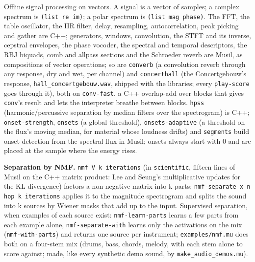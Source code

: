 \documentclass[11pt,a4paper]{article}
\newcommand{\musil}[1]{\lstinline[style=musilinline]{#1}}
\begin{document}
Offline signal processing on vectors. A signal is a vector of samples; a complex
spectrum is \musil{(list re im)}; a polar spectrum is \musil{(list mag phase)}. The FFT,
the table oscillator, the IIR filter, delay, resampling, autocorrelation, peak
picking and gather are C++; generators, windows, convolution, the STFT and its
inverse, cepstral envelopes, the phase vocoder, the spectral and temporal descriptors,
the RBJ biquads, comb and allpass sections and the Schroeder reverb are Musil, as
compositions of vector operations; so are \musil{converb} (a convolution reverb through
any response, dry and wet, per channel) and \musil{concerthall} (the Concertgebouw's
response, \texttt{hall\_concertgebouw.wav}, shipped with the libraries; every
\musil{play-score} goes through it), both on \musil{conv-fast}, a C++ overlap-add over
blocks that gives \musil{conv}'s result and lets the interpreter breathe between blocks. \musil{hpss} (harmonic/percussive separation by median
filters over the spectrogram) is C++; \musil{onset-strength}, \musil{onsets} (a global
threshold), \musil{onsets-adaptive} (a threshold on the flux's moving median, for
material whose loudness drifts) and \musil{segments} build onset detection from the
spectral flux in Musil; onsets always start with 0 and are placed at the sample where
the energy rises.

\textbf{Separation by NMF.} \musil{nmf V k iterations} (in \texttt{scientific}, fifteen
lines of Musil on the C++ matrix product: Lee and Seung's multiplicative updates for the
KL divergence) factors a non-negative matrix into k parts; \musil{nmf-separate x n hop k
iterations} applies it to the magnitude spectrogram and splits the sound into k sources by
Wiener masks that add up to the input. Supervised separation, when examples of each source
exist: \musil{nmf-learn-parts} learns a few parts from each example alone,
\musil{nmf-separate-with} learns only the activations on the mix (\musil{nmf-with-parts})
and returns one source per instrument; \texttt{examples/nmf.mu} does both on a four-stem
mix (drums, bass, chords, melody, with each stem alone to score against; made, like every
synthetic demo sound, by \texttt{make\_audio\_demos.mu}).
\end{document}
